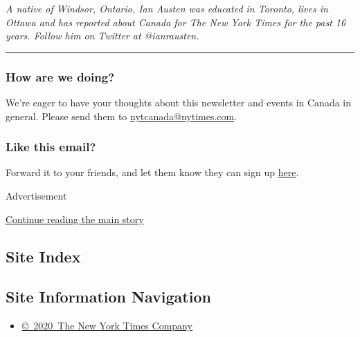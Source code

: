 \emph{A native of Windsor, Ontario, Ian Austen was educated in Toronto,
lives in Ottawa and has reported about Canada for The New York Times for
the past 16 years. Follow him on Twitter at @ianrausten.}

\begin{center}\rule{0.5\linewidth}{\linethickness}\end{center}

\hypertarget{how-are-we-doing}{%
\subsubsection{\texorpdfstring{\textbf{How are we
doing?}}{How are we doing?}}\label{how-are-we-doing}}

We're eager to have your thoughts about this newsletter and events in
Canada in general. Please send them to
\href{mailto:nytcanada@nytimes.com?\%20subject=Canada\%20Letter\%20Newsletter\%20Feedback}{nytcanada@nytimes.com}.

\hypertarget{like-this-email}{%
\subsubsection{\texorpdfstring{\textbf{Like this
email?}}{Like this email?}}\label{like-this-email}}

Forward it to your friends, and let them know they can sign up
\href{https://www.nytimes.com/newsletters/canada-letter?smid=nytemail\&smvar=canadaletter\&te=1\&nl=canada-today\&emc=edit_cnda_20190622}{here}.

Advertisement

\protect\hyperlink{after-bottom}{Continue reading the main story}

\hypertarget{site-index}{%
\subsection{Site Index}\label{site-index}}

\hypertarget{site-information-navigation}{%
\subsection{Site Information
Navigation}\label{site-information-navigation}}

\begin{itemize}
\tightlist
\item
  \href{https://help.nytimes.com/hc/en-us/articles/115014792127-Copyright-notice}{©~2020~The
  New York Times Company}
\end{itemize}

